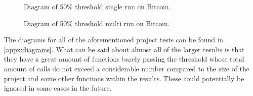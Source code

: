 \begin{figure}[H]
	\caption{Diagram of 50\% threshold single run on Bitcoin.}
	\label{fig:bc-50-single}
\end{figure}

\begin{figure}[H]
	\caption{Diagram of 50\% threshold multi run on Bitcoin.}
	\label{fig:bc-50-multi}
\end{figure}

The diagrams for all of the aforementioned project tests can be found in \cref{appx:diagrams}.
What can be said about almost all of the larger results is that they have a great amount of functions barely passing the threshold whose total
amount of calls do not exceed a considerable number compared to the size of the project and some other functions within the results. These could
potentially be ignored in some cases in the future.

